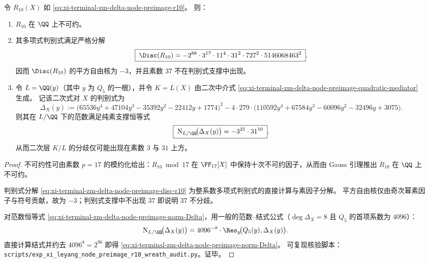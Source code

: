 \begin{theorem}[十次层判别式与二次分裂的分歧支撑]\label{thm:xi-terminal-zm-delta-node-preimage-discriminant-and-norm}
令 \(R_{10}(X)\) 如 \eqref{eq:xi-terminal-zm-delta-node-preimage-r10}。
则：
\begin{enumerate}
  \item \(R_{10}\) 在 \(\QQ\) 上不可约。
  \item 其多项式判别式满足严格分解
  \begin{equation}\label{eq:xi-terminal-zm-delta-node-preimage-disc-r10}
  \boxed{\;\Disc(R_{10})=-2^{88}\cdot 3^{17}\cdot 11^{4}\cdot 31^{2}\cdot 727^{2}\cdot 5146068463^{2}\;} .
  \end{equation}
  因而 \(\Disc(R_{10})\) 的平方自由核为 \(-3\)，并且素数 \(37\) 不在判别式支撑中出现。
  \item 令 \(L=\QQ(y)\)（其中 \(y\) 为 \(Q_5\) 的一根），并令 \(K=L(X)\) 由二次中介式 \eqref{eq:xi-terminal-zm-delta-node-preimage-quadratic-mediator} 生成。
  记该二次式对 \(X\) 的判别式为
  \begin{equation}\label{eq:xi-terminal-zm-delta-node-preimage-Delta-y}
  \Delta_X(y)
  :=\bigl(65536y^{4}+47104y^{3}-35392y^{2}-22412y+1774\bigr)^{2}
  -4\cdot 279\cdot\bigl(110592y^{4}+67584y^{3}-60096y^{2}-32496y+3075\bigr).
  \end{equation}
  则其在 \(L/\QQ\) 下的范数满足纯素支撑恒等式
  \begin{equation}\label{eq:xi-terminal-zm-delta-node-preimage-norm-Delta}
  \boxed{\;\mathrm N_{L/\QQ}\!\bigl(\Delta_X(y)\bigr)=-3^{25}\cdot 31^{10}\;} .
  \end{equation}
  从而二次层 \(K/L\) 的分歧仅可能出现在素数 \(3\) 与 \(31\) 上方。
\end{enumerate}
\end{theorem}

\begin{proof}
不可约性可由素数 \(p=17\) 的模约化给出：\(R_{10}\bmod 17\) 在 \(\FF_{17}[X]\) 中保持十次不可约因子，从而由 Gauss 引理推出 \(R_{10}\) 在 \(\QQ\) 上不可约。
\par
判别式分解 \eqref{eq:xi-terminal-zm-delta-node-preimage-disc-r10} 为整系数多项式判别式的直接计算与素因子分解。
平方自由核仅由奇次幂素因子与符号贡献，故为 \(-3\)；判别式支撑中不出现 \(37\) 即说明 \(37\) 不分歧。
\par
对范数恒等式 \eqref{eq:xi-terminal-zm-delta-node-preimage-norm-Delta}，用一般的范数--结式公式（\(\deg\Delta_X=8\) 且 \(Q_5\) 的首项系数为 \(4096\)）：
\[
\mathrm N_{L/\QQ}\!\bigl(\Delta_X(y)\bigr)=4096^{-8}\cdot \Res_{y}\!\bigl(Q_5(y),\Delta_X(y)\bigr).
\]
直接计算结式并约去 \(4096^{8}=2^{96}\) 即得 \eqref{eq:xi-terminal-zm-delta-node-preimage-norm-Delta}。
可复现核验脚本：\texttt{scripts/exp\_xi\_leyang\_node\_preimage\_r10\_wreath\_audit.py}。证毕。
\end{proof}

